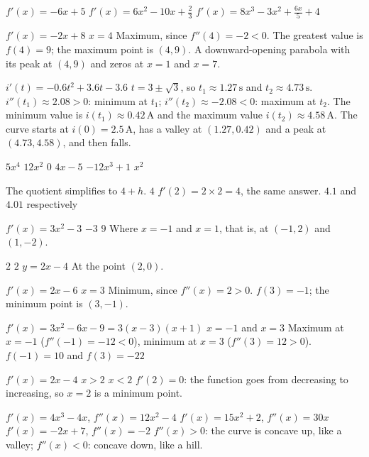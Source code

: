
\begin{facit}

  $f'(x) = -6x + 5$  $f'(x) = 6x^2 - 10x + \frac{2}{3}$
 $f'(x) = 8x^3 - 3x^2 + \frac{6x}{5} + 4$

  $f'(x) = -2x + 8$  $x = 4$  Maximum, since
$f''(4) = -2 < 0$.  The greatest value is $f(4) = 9$; the maximum point is $(4, 9)$.
 A downward-opening parabola with its peak at $(4, 9)$ and zeros at $x = 1$ and $x = 7$.

  $i'(t) = -0.6t^2 + 3.6t - 3.6$
 $t = 3 \pm \sqrt{3}$, so $t_1 \approx 1.27\,\text{s}$ and
$t_2 \approx 4.73\,\text{s}$.
 $i''(t_1) \approx 2.08 > 0$: minimum at $t_1$; $i''(t_2) \approx -2.08 < 0$:
maximum at $t_2$.
 The minimum value is $i(t_1) \approx 0.42\,\text{A}$ and the maximum value
$i(t_2) \approx 4.58\,\text{A}$.
 The curve starts at $i(0) = 2.5\,\text{A}$, has a valley at $(1.27, 0.42)$ and a peak at
$(4.73, 4.58)$, and then falls.

  $5x^4$  $12x^2$  $0$  $4x - 5$  $-12x^3 + 1$
 $x^2$

  The quotient simplifies to $4 + h$.  $4$
 $f'(2) = 2 \times 2 = 4$, the same answer.  $4.1$ and $4.01$ respectively

  $f'(x) = 3x^2 - 3$  $-3$  $9$
 Where $x = -1$ and $x = 1$, that is, at $(-1, 2)$ and $(1, -2)$.

  $2$  $2$  $y = 2x - 4$  At the point $(2, 0)$.

  $f'(x) = 2x - 6$  $x = 3$  Minimum, since $f''(x) = 2 > 0$.
 $f(3) = -1$; the minimum point is $(3, -1)$.

  $f'(x) = 3x^2 - 6x - 9 = 3(x - 3)(x + 1)$  $x = -1$ and $x = 3$
 Maximum at $x = -1$ ($f''(-1) = -12 < 0$), minimum at $x = 3$ ($f''(3) = 12 > 0$).
 $f(-1) = 10$ and $f(3) = -22$

  $f'(x) = 2x - 4$  $x > 2$  $x < 2$
 $f'(2) = 0$: the function goes from decreasing to increasing, so $x = 2$ is a minimum point.

  $f'(x) = 4x^3 - 4x$, $f''(x) = 12x^2 - 4$
 $f'(x) = 15x^2 + 2$, $f''(x) = 30x$  $f'(x) = -2x + 7$, $f''(x) = -2$
 $f''(x) > 0$: the curve is concave up, like a valley; $f''(x) < 0$: concave down, like a
hill.


\end{facit}
